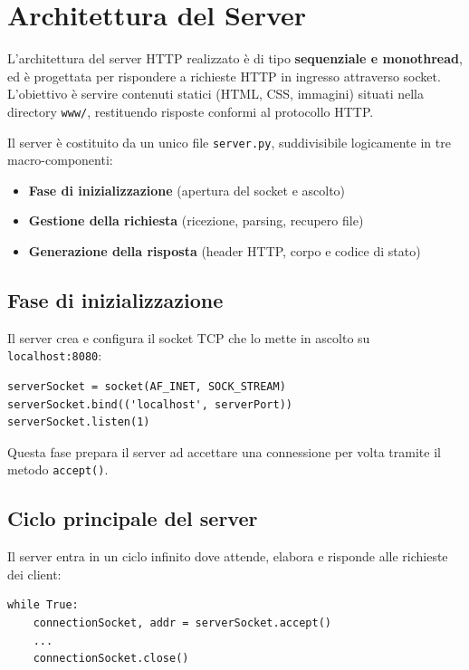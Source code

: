 \documentclass[a4paper,12pt]{report}
\begin{document}
\chapter{Architettura del Server}

L'architettura del server HTTP realizzato è di tipo \textbf{sequenziale e monothread}, ed è progettata per rispondere a richieste HTTP in ingresso attraverso socket. L'obiettivo è servire contenuti statici (HTML, CSS, immagini) situati nella directory \texttt{www/}, restituendo risposte conformi al protocollo HTTP.

Il server è costituito da un unico file \texttt{server.py}, suddivisibile logicamente in tre macro-componenti:
\begin{itemize}
    \item \textbf{Fase di inizializzazione} (apertura del socket e ascolto)
    \item \textbf{Gestione della richiesta} (ricezione, parsing, recupero file)
    \item \textbf{Generazione della risposta} (header HTTP, corpo e codice di stato)
\end{itemize}

\section{Fase di inizializzazione}

Il server crea e configura il socket TCP che lo mette in ascolto su \texttt{localhost:8080}:

\begin{verbatim}
serverSocket = socket(AF_INET, SOCK_STREAM)
serverSocket.bind(('localhost', serverPort))
serverSocket.listen(1)
\end{verbatim}

Questa fase prepara il server ad accettare una connessione per volta tramite il metodo \texttt{accept()}.

\newpage

\section{Ciclo principale del server}

Il server entra in un ciclo infinito dove attende, elabora e risponde alle richieste dei client:

\begin{verbatim}
while True:
    connectionSocket, addr = serverSocket.accept()
    ...
    connectionSocket.close()
\end{verbatim}
\end{document}
